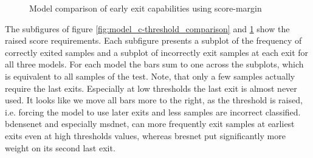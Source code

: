 \begin{minipage}{\linewidth}
\begin{figure}
		\hfill
		\hfill
		\hfill
		\hfill
		
		\caption[Model comparison of early exit capabilities]{Model comparison of early exit capabilities using score-margin}
		\label{fig:model_threshold_comparison}
	\end{figure}
	
\end{minipage}

The subfigures of figure \ref{fig:model_c-threshold_comparison} and \ref{fig:model_threshold_comparison} show the raised score requirements. Each subfigure presents a subplot of the frequency of correctly exited samples and a subplot of incorrectly exit samples at each exit for all three models. For each model the bars sum to one across the subplots, which is equivalent to all samples of the test. Note, that only a few samples actually require the last exits. Especially at low thresholds the last exit is almost never used. It looks like we move all bars more to the right, as the threshold is raised, i.e. forcing the model to use later exits and less samples are incorrect classified. \gls{bdensenet} and especially \gls{msdnet}, can more frequently exit samples at earliest exits even at high thresholds values, whereas \gls{bresnet} put significantly more weight on its second last exit. 

